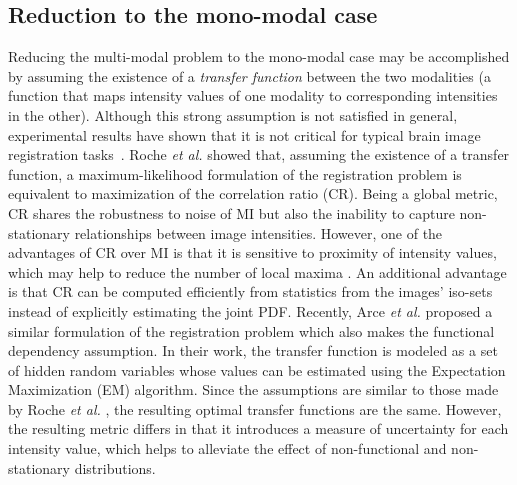 \subsection{Reduction to the mono-modal case}
Reducing the multi-modal problem to the mono-modal case may be accomplished by assuming the existence of a {\it transfer function} between the two modalities (a function that maps intensity values of one modality to corresponding intensities in the other). Although this strong assumption is not satisfied in general, experimental results have shown that it is not critical for typical brain image registration tasks~\cite{Roche1998}. Roche {\it et al.} \cite{Roche2000} showed that, assuming the existence of a transfer function, a maximum-likelihood formulation of the registration problem is equivalent to maximization of the correlation ratio (CR). Being a global metric, CR shares the robustness to noise of MI but also the inability to capture non-stationary relationships between image intensities. However, one of the advantages of CR over MI is that it is sensitive to proximity of intensity values, which may help to reduce the number of local maxima \cite{Roche1998}. An additional advantage is that CR can be computed efficiently from statistics from the images' iso-sets instead of explicitly estimating the joint PDF. Recently, Arce {\it et al.} \cite{Arce-santana2014} proposed a similar formulation of the registration problem which also makes the functional dependency assumption. In their work, the transfer function is modeled as a set of hidden random variables whose values can be estimated using the Expectation Maximization (EM) algorithm. Since the assumptions are similar to those made by Roche {\it et al.} \cite{Roche1998, Roche2000}, the resulting optimal transfer functions are the same. However, the resulting metric differs in that it introduces a measure of uncertainty for each intensity value, which helps to alleviate the effect of non-functional and non-stationary distributions.


